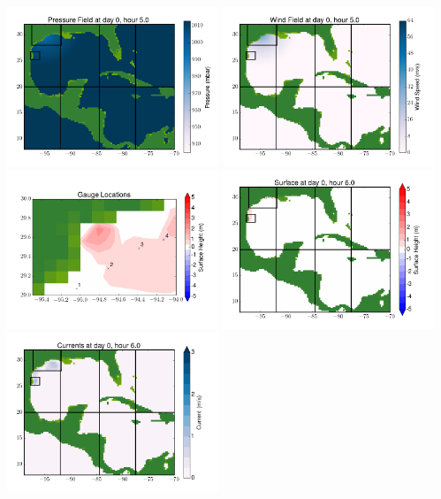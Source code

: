 \documentclass[11pt]{article}
\begin{document}
\includegraphics[width=0.475\textwidth]{frame0077fig8.png}
\vskip 10pt 
\includegraphics[width=0.475\textwidth]{frame0077fig9.png}
\includegraphics[width=0.475\textwidth]{frame0077fig10.png}
\vskip 10pt 
\includegraphics[width=0.475\textwidth]{frame0078fig1.png}
\includegraphics[width=0.475\textwidth]{frame0078fig2.png}
\end{document}
